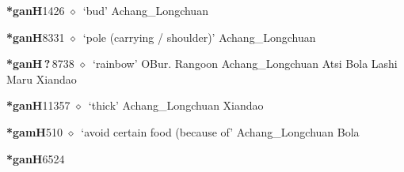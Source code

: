   \begin{list}{}{\leftmargin=1.5em \itemindent=-1.5em}
  \item {\footnotesize \textbf{*ganH}}{\tiny 1426}
         $\diamond$~`bud'
         Achang\_Longchuan 
  \item {\footnotesize \textbf{*ganH}}{\tiny 8331}
\hspace{1ex}
         $\diamond$~`pole (carrying / shoulder)'
         Achang\_Longchuan 
  \item {\footnotesize \textbf{*ganH\,?\,}}{\tiny 8738}
\hspace{1ex}
         $\diamond$~`rainbow'
         OBur. 
\hspace{1ex}
         Rangoon 
\hspace{1ex}
         Achang\_Longchuan 
\hspace{1ex}
         Atsi 
\hspace{1ex}
         Bola 
\hspace{1ex}
         Lashi 
\hspace{1ex}
         Maru 
\hspace{1ex}
         Xiandao 
  \item {\footnotesize \textbf{*ganH}}{\tiny 11357}
\hspace{1ex}
         $\diamond$~`thick'
         Achang\_Longchuan 
\hspace{1ex}
         Xiandao 
  \item {\footnotesize \textbf{*gamH}}{\tiny 510}
\hspace{1ex}
         $\diamond$~`avoid certain food (because of'
         Achang\_Longchuan 
\hspace{1ex}
         Bola 
  \item {\footnotesize \textbf{*ganH}}{\tiny 6524}

\end{list}
